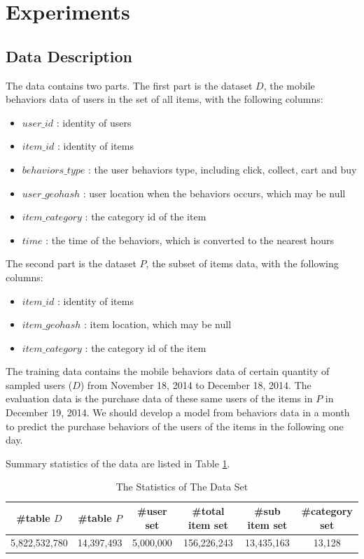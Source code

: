 \documentclass{llncs}
\begin{document}
\section{Experiments}
\subsection{Data Description}
The data contains two parts.
The first part is the dataset $D$, the mobile behaviors data of users in the set of all items,
with the following columns:
\begin{itemize}
	\item $user\_id$ : identity of users
	\item $item\_id$ : identity of items
	\item $behaviors\_type$ : the user behaviors type, including click, collect, cart and buy
	\item $user\_geohash$ : user location when the behaviors occurs, which may be null
	\item $item\_category$ : the category id of the item
	\item $time$ : the time of the behaviors, which is converted to the nearest hours
\end{itemize}

The second part is the dataset $P$, the subset of items data,
with the following columns:
\begin{itemize}
	\item $item\_id$ : identity of items
	\item $item\_geohash$ : item location, which may be null
	\item $item\_category$ : the category id of the item
\end{itemize}

The training data contains the mobile behaviors data of
certain quantity of sampled users ($D$) from November 18, 2014
to December 18, 2014.
The evaluation data is the purchase data of these same users of
the items in $P$ in December 19, 2014.
We should develop a model from behaviors data in a month
to predict the purchase behaviors of the users of the items
in the following one day.

Summary statistics of the data are listed in Table \ref{tab:sta}.
\begin{table}[htbp]
	\normalsize
	\centering
	\caption{The Statistics of The Data Set}
	\begin{tabular}{|c|c|c|c|c|c|}
		\hline
		\#table $D$ & \#table $P$ & \#user set & \#total item set & \#sub item set & \#category set \\
		\hline
		5,822,532,780 & 14,397,493 & 5,000,000 & 156,226,243 & 13,435,163 & 13,128 \\
		\hline
	\end{tabular}
	\label{tab:sta}
\end{table}
\end{document}
